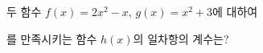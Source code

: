 두 함수 $f(x)=2x^2-x$, $g(x)=x^2+3$에 대하여\par\smallskip{}\par\smallskip\noindent 를 만족시키는 함수 $h(x)$의 일차항의 계수는?
